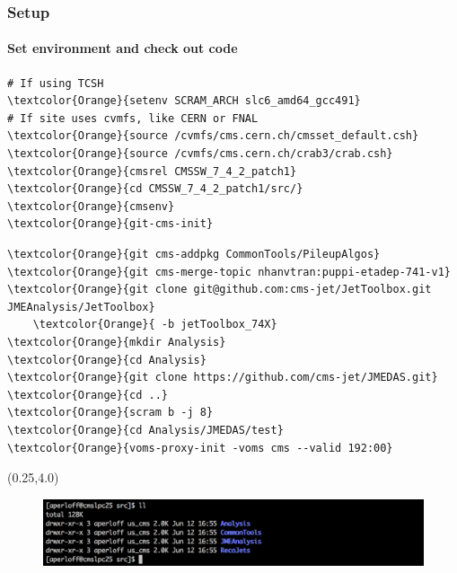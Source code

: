 \begin{frame}[fragile]
	\frametitle{Setup}
	\framesubtitle{Set environment and check out code}

\begin{Verbatim}[label={Setup Commands}]
# If using TCSH
\textcolor{Orange}{setenv SCRAM_ARCH slc6_amd64_gcc491}
# If site uses cvmfs, like CERN or FNAL
\textcolor{Orange}{source /cvmfs/cms.cern.ch/cmsset_default.csh}
\textcolor{Orange}{source /cvmfs/cms.cern.ch/crab3/crab.csh}
\textcolor{Orange}{cmsrel CMSSW_7_4_2_patch1}
\textcolor{Orange}{cd CMSSW_7_4_2_patch1/src/}
\textcolor{Orange}{cmsenv}
\textcolor{Orange}{git-cms-init}
\end{Verbatim}

\begin{Verbatim}[label={Check out the code for the first exercise}]
\textcolor{Orange}{git cms-addpkg CommonTools/PileupAlgos}
\textcolor{Orange}{git cms-merge-topic nhanvtran:puppi-etadep-741-v1}
\textcolor{Orange}{git clone git@github.com:cms-jet/JetToolbox.git JMEAnalysis/JetToolbox}
	\textcolor{Orange}{ -b jetToolbox_74X}
\textcolor{Orange}{mkdir Analysis}
\textcolor{Orange}{cd Analysis}
\textcolor{Orange}{git clone https://github.com/cms-jet/JMEDAS.git}
\textcolor{Orange}{cd ..}
\textcolor{Orange}{scram b -j 8}
\textcolor{Orange}{cd Analysis/JMEDAS/test}
\textcolor{Orange}{voms-proxy-init -voms cms --valid 192:00}
\end{Verbatim}

	\begin{textblock}{12.3}(0.25,4.0)
		\begin{figure}
			\includegraphics[width=\textwidth]{images/setup_software}
			\label{fig:setup_software}
		\end{figure}
	\end{textblock}

\end{frame}

